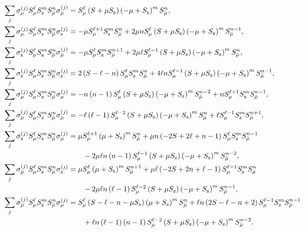 \documentclass[aps,notitlepage,nofootinbib,11pt]{revtex4-1}
\newcommand{\p}[1]{\left(#1\right)} %
\newcommand{\z}{\text{z}}
\newcommand{\bmu}{{\bar\mu}}
\newcommand{\1}{\mathds{1}}
\begin{document}
\begin{align}
  \sum_j \sigma_\mu^{(j)} S_\mu^\ell S_\z^m S_\bmu^n \sigma_\bmu^{(j)}
  &= S_\mu^\ell \p{S+\mu S_\z}\p{-\mu+S_\z}^m S_\bmu^n,
  \label{eq:sand_mu_bmu} \allowdisplaybreaks \\
  \sum_j \sigma_\mu^{(j)} S_\mu^\ell S_\z^m S_\bmu^n \sigma_\z^{(j)}
  &= -\mu S_\mu^{\ell+1} S_\z^m S_\bmu^n
  + 2\mu n S_\mu^\ell \p{S+\mu S_\z} \p{-\mu+S_\z}^m S_\bmu^{n-1},
  \allowdisplaybreaks \\
  \sum_j \sigma_\z^{(j)} S_\mu^\ell S_\z^m S_\bmu^n \sigma_\bmu^{(j)}
  &= -\mu S_\mu^\ell S_\z^m S_\bmu^{n+1}
  + 2\mu \ell S_\mu^{\ell-1} \p{S+\mu S_\z}\p{-\mu+S_\z}^m S_\bmu^n,
  \allowdisplaybreaks \\
  \sum_j \sigma_\z^{(j)} S_\mu^\ell S_\z^m S_\bmu^n \sigma_\z^{(j)}
  &= 2\p{S-\ell-n} S_\mu^\ell S_\z^m S_\bmu^n
  + 4\ell n S_\mu^{\ell-1} \p{S+\mu S_\z}
  \p{-\mu+S_\z}^m S_\bmu^{n-1},
  \label{eq:sand_z_z} \allowdisplaybreaks \\
  \sum_j \sigma_\mu^{(j)} S_\mu^\ell S_\z^m S_\bmu^n \sigma_\mu^{(j)}
  &= -n\p{n-1} S_\mu^\ell \p{S+\mu S_\z} \p{-\mu+S_\z}^m S_\bmu^{n-2}
  + n S_\mu^{\ell+1} S_\z^m S_\bmu^{n-1},
  \allowdisplaybreaks \\
  \sum_j \sigma_\bmu^{(j)} S_\mu^\ell S_\z^m S_\bmu^n \sigma_\bmu^{(j)}
  &= -\ell \p{\ell-1} S_\mu^{\ell-2}
  \p{S+\mu S_\z} \p{-\mu+S_\z}^m S_\bmu^n
  + \ell S_\mu^{\ell-1} S_\z^m S_\bmu^{n+1},
  \allowdisplaybreaks \\
  \sum_j \sigma_\z^{(j)} S_\mu^\ell S_\z^m S_\bmu^n \sigma_\mu^{(j)}
  &= \mu S_\mu^{\ell+1} \p{\mu+S_\z}^m S_\bmu^n
  + \mu n \p{-2S+2\ell+n-1} S_\mu^\ell S_\z^m S_\bmu^{n-1} \notag \\
  &\qquad - 2\mu\ell n\p{n-1} S_\mu^{\ell-1}
  \p{S+\mu S_\z} \p{-\mu+S_\z}^m S_\bmu^{n-2},
  \allowdisplaybreaks \\
  \sum_j \sigma_\bmu^{(j)} S_\mu^\ell S_\z^m S_\bmu^n \sigma_\z^{(j)}
  &= \mu S_\mu^\ell \p{\mu+S_\z}^m S_\bmu^{n+1}
  + \mu \ell \p{-2S+2n+\ell-1} S_\mu^{\ell-1} S_\z^m S_\bmu^n \notag \\
  &\qquad - 2\mu\ell n\p{\ell-1} S_\mu^{\ell-2}
  \p{S+\mu S_\z} \p{-\mu+S_\z}^m S_\bmu^{n-1},
  \allowdisplaybreaks \\
  \sum_j \sigma_\bmu^{(j)} S_\mu^\ell S_\z^m S_\bmu^n \sigma_\mu^{(j)}
  &= S_\mu^\ell \p{S - \ell - n - \mu S_\z} \p{\mu + S_\z}^m S_\bmu^n
  + \ell n \p{2S - \ell - n + 2}
  S_\mu^{\ell-1} S_\z^m S_\bmu^{n-1} \notag \\
  &\qquad + \ell n \p{\ell-1} \p{n-1} S_\mu^{\ell-2} \p{S + \mu S_\z}
  \p{-\mu + S_\z}^m S_\bmu^{n-2}.
  \label{eq:sand_bmu_mu}
\end{align}
\end{document}
